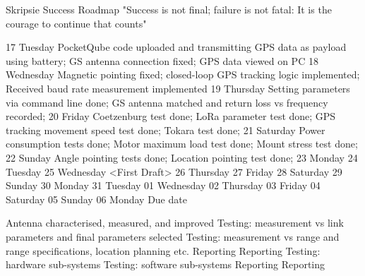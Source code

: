 Skripsie Success Roadmap
"Success is not final; failure is not fatal: It is the courage to continue that counts"

17 Tuesday          PocketQube code uploaded and transmitting GPS data as payload using battery; GS antenna connection fixed; GPS data viewed on PC
18 Wednesday        Magnetic pointing fixed; closed-loop GPS tracking logic implemented; Received baud rate measurement implemented
19 Thursday         Setting parameters via command line done; GS antenna matched and return loss vs frequency recorded; 
20 Friday           Coetzenburg test done; LoRa parameter test done; GPS tracking movement speed test done; Tokara test done; 
21 Saturday         Power consumption tests done; Motor maximum load test done; Mount stress test done; 
22 Sunday           Angle pointing tests done; Location pointing test done; 
23 Monday          
24 Tuesday          
25 Wednesday        <First Draft>
26 Thursday         
27 Friday           
28 Saturday         
29 Sunday           
30 Monday           
31 Tuesday          
01 Wednesday        
02 Thursday         
03 Friday           
04 Saturday         
05 Sunday           
06 Monday           Due date

Antenna characterised, measured, and improved
Testing: measurement vs link parameters and final parameters selected
Testing: measurement vs range and range specifications, location planning etc.
Reporting
Reporting
Testing: hardware sub-systems
Testing: software sub-systems
Reporting
Reporting